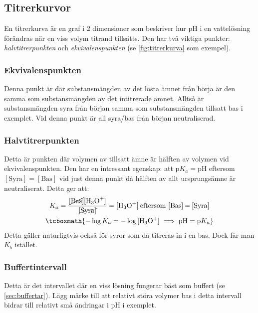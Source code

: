 \subsection{Titrerkurvor}
\begin{figure*}[h]
    \centering
    \caption{Titrerkurva. $V_{eq} = V_{bas} \text{ vid ekvivalens och } n_0 = n_{syra} \text{ vid start}$.}
    \label{fig:titrerkurva}
\end{figure*}
\noindent En titrerkurva är en graf i 2 dimensioner som beskriver hur pH i en vattelösning förändras när en viss volym titrand tillsätts. Den har två viktiga punkter: \emph{halvtitrerpunkten} och \emph{ekvivalenspunkten} (se \cref{fig:titrerkurva} som exempel).
\subsubsection*{Ekvivalenspunkten}
Denna punkt är där substansmängden av det lösta ämnet från börja är den samma som substansmängden av det intitrerade ämnet. Alltså är substansmängden syra från början samma som substansmängden tillsatt bas i exemplet. Vid denna punkt är all syra/bas från början neutraliserad.

\subsubsection*{Halvtitrerpunkten}
Detta är punkten där volymen av tillsatt ämne är hälften av volymen vid ekvivalenspunkten. Den har en intressant egenskap: att $\mathrm{p}K_{a} = \mathrm{pH}$
eftersom $[\mathrm{Syra}] = [\mathrm{Bas}]$ vid just denna punkt då hälften av allt ursprungsämne är neutraliserat. Detta ger att:
\begin{gather*}
    K_a = \ce{\frac{\cancel{[\mathrm{Bas}]}[H3O+]}{\cancel{[\mathrm{Syra}]}}} = \ce{[H3O+]}\: \text{eftersom } \ce{[Bas] = [Syra]} \\
    \tcboxmath{-\log{K_a} = -\log{[\mathrm{H_3O^+}]} \implies \mathrm{pH} = \mathrm{p}K_a}
\end{gather*}
Detta gäller naturligtvis också för syror som då titreras in i en bas. Dock får man $K_b$ istället.

\subsubsection{Buffertintervall}
Detta är det intervallet där en viss lösning fungerar bäst som buffert (se \vref{sec:buffertar}). Lägg märke till att relativt störa volymer bas i detta intervall bidrar till relativt små ändringar i pH i exemplet.